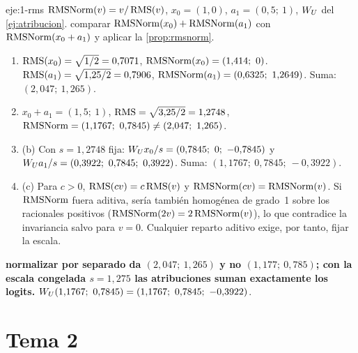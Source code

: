 \begin{solucion}{eje:1-rms}
\datos $\operatorname{RMSNorm}(v)=v/\operatorname{RMS}(v)$, $x_0=(1,0)$, $a_1=(0{,}5;\allowbreak\ 1)$, $W_{U}$ del \cref{ej:atribucion}.
\planteamiento comparar $\operatorname{RMSNorm}(x_0)+\operatorname{RMSNorm}(a_1)$ con $\operatorname{RMSNorm}(x_0+a_1)$ y aplicar la \cref{prop:rmsnorm}.
\pasos
\begin{enumerate}[label=\arabic*.]
  \item $\operatorname{RMS}(x_0)=\sqrt{1/2}=0{,}7071$, $\RMSNorm(x_0)=(1{,}414;\allowbreak\ 0)$. $\operatorname{RMS}(a_1)=\sqrt{1{,}25/2}=0{,}7906$, $\RMSNorm(a_1)=(0{,}6325;\allowbreak\ 1{,}2649)$. Suma: $(2{,}047;\allowbreak\ 1{,}265)$.
  \item $x_0+a_1=(1{,}5;\allowbreak\ 1)$, $\operatorname{RMS}=\sqrt{3{,}25/2}=1{,}2748$, $\RMSNorm=(1{,}1767;\allowbreak\ 0{,}7845)\neq(2{,}047;\allowbreak\ 1{,}265)$.
  \item (b) Con $s=1{,}2748$ fija: $\WU x_0/s=(0{,}7845;\allowbreak\ 0;\allowbreak\ -0{,}7845)$ y $W_{U} a_1/s=(0{,}3922;\allowbreak\ 0{,}7845;\allowbreak\ 0{,}3922)$. Suma: $(1{,}1767;\allowbreak\ 0{,}7845;\allowbreak\ -0{,}3922)$.
  \item (c) Para $c>0$, $\operatorname{RMS}(cv)=c\operatorname{RMS}(v)$ y $\operatorname{RMSNorm}(cv)=\operatorname{RMSNorm}(v)$. Si $\operatorname{RMSNorm}$ fuera aditiva, sería también homogénea de grado~1 sobre los racionales positivos ($\operatorname{RMSNorm}(2v)=2\operatorname{RMSNorm}(v)$), lo que contradice la invariancia salvo para $v=0$. Cualquier reparto aditivo exige, por tanto, fijar la escala.
\end{enumerate}
\resultado \textbf{normalizar por separado da $(2{,}047;\allowbreak\ 1{,}265)$ y no $(1{,}177;\allowbreak\ 0{,}785)$; con la escala congelada $s=1{,}275$ las atribuciones suman exactamente los logits.}
\comprobacion $\WU(1{,}1767;\allowbreak\ 0{,}7845)=(1{,}1767;\allowbreak\ 0{,}7845;\allowbreak\ -0{,}3922)$.
\end{solucion}

\section{Tema 2}

